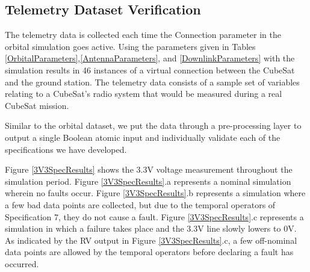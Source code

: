 \documentclass[conf]{new-aiaa}
\begin{document}

\subsection{Telemetry Dataset Verification}

The telemetry data is collected each time the Connection parameter in the orbital simulation goes active. Using the parameters given in Tables \ref{OrbitalParameters},\ref{AntennaParameters}, and \ref{DownlinkParameters} with the simulation results in 46 instances of a virtual connection between the CubeSat and the ground station. The telemetry data consists of a sample set of variables relating to a CubeSat's radio system that would be measured during a real CubeSat mission.

Similar to the orbital dataset, we put the data through a pre-processing layer to output a single Boolean atomic input and individually validate each of the specifications we have developed.

Figure \ref{3V3SpecResults} shows the 3.3V voltage measurement throughout the simulation period. Figure \ref{3V3SpecResults}.a represents a nominal simulation wherein no faults occur. Figure \ref{3V3SpecResults}.b represents a simulation where a few bad data points are collected, but due to the temporal operators of Specification 7, they do not cause a fault. Figure \ref{3V3SpecResults}.c represents a simulation in which a failure takes place and the 3.3V line slowly lowers to 0V. As indicated by the RV output in Figure \ref{3V3SpecResults}.c, a few off-nominal data points are allowed by the temporal operators before declaring a fault has occurred.
\end{document}
